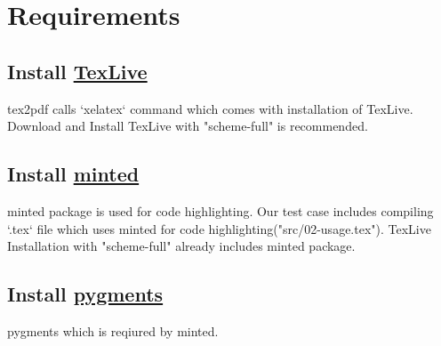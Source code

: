 \section{Requirements}

\subsection{Install \href{https://tug.org/texlive/}{TexLive}}
tex2pdf calls `xelatex` command which comes with installation of TexLive.
Download and Install TexLive with "scheme-full" is recommended.

\subsection{Install \href{https://www.ctan.org/pkg/minted}{minted}} 
minted package is used for code highlighting.
Our test case includes compiling `.tex` file which uses minted for code highlighting("src/02-usage.tex").
TexLive Installation with "scheme-full" already includes minted package.

\subsection{Install \href{https://pygments.org/download/}{pygments}}
pygments which is reqiured by minted.

